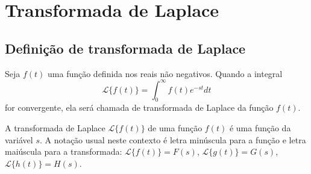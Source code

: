 


\chapter{Transformada de Laplace}
\section{Definição de transformada de Laplace}{\label{sec_1}}
\begin{defn}Seja $f(t)$ uma função definida nos reais não negativos. Quando a integral
$$
{\mathcal{L}}\{f(t)\}=\int_0^\infty f(t)e^{-st}dt
$$
for convergente, ela será chamada de transformada de Laplace da função $f(t)$.
\end{defn}
A transformada de Laplace $\mathcal{L}\{f(t)\}$ de uma função $f(t)$ é uma função da variável $s$. A notação usual neste contexto é letra minúscula para a função e letra maiúscula para a transformada: $\mathcal{L}\{f(t)\}=F(s)$, $\mathcal{L}\{g(t)\}=G(s)$, $\mathcal{L}\{h(t)\}=H(s)$.

